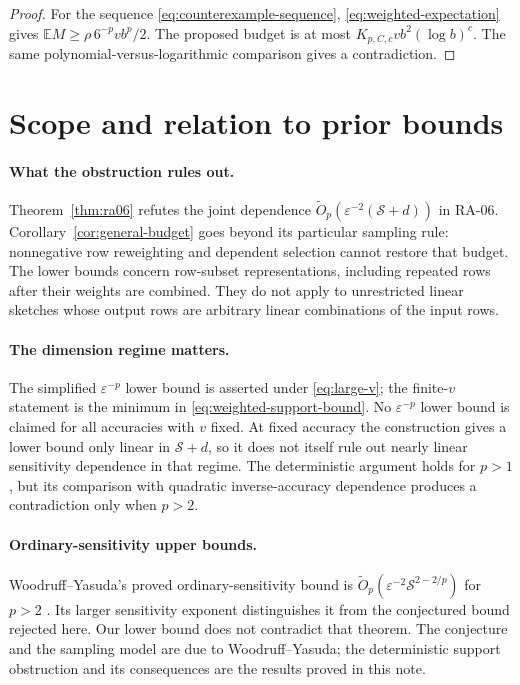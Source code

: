\documentclass[11pt]{article}
\theoremstyle{spaced}
\numberwithin{equation}{section}
\newcommand{\E}{\mathbb{E}}
\newcommand{\Sp}{\mathcal{S}}
\begin{document}
\begin{proof}
For the sequence \eqref{eq:counterexample-sequence},
\eqref{eq:weighted-expectation} gives
$\E M\ge\rho\,6^{-p}vb^p/2$. The proposed budget is at most
$K_{p,C,c}vb^2(\log b)^c$. The same polynomial-versus-logarithmic
comparison gives a contradiction.
\end{proof}

\section{Scope and relation to prior bounds}\label{sec:scope}

\paragraph{What the obstruction rules out.}
Theorem~\ref{thm:ra06} refutes the joint dependence
$\widetilde O_p(\varepsilon^{-2}(\Sp+d))$ in RA-06.
Corollary~\ref{cor:general-budget} goes beyond its particular sampling
rule: nonnegative row reweighting and dependent selection cannot restore
that budget. The lower bounds concern row-subset representations,
including repeated rows after their weights are combined. They do not
apply to unrestricted linear sketches whose output rows are arbitrary
linear combinations of the input rows.

\paragraph{The dimension regime matters.}
The simplified $\varepsilon^{-p}$ lower bound is asserted under
\eqref{eq:large-v}; the finite-$v$ statement is the minimum in
\eqref{eq:weighted-support-bound}. No $\varepsilon^{-p}$ lower bound
is claimed for all accuracies with $v$ fixed. At fixed accuracy the
construction gives a lower bound only linear in $\Sp+d$, so it does
not itself rule out nearly linear sensitivity dependence in that regime.
The deterministic argument holds for $p>1$, but its comparison with
quadratic inverse-accuracy dependence produces a contradiction only
when $p>2$.

\paragraph{Ordinary-sensitivity upper bounds.}
Woodruff--Yasuda's proved ordinary-sensitivity bound is
$\widetilde O_p(\varepsilon^{-2}\Sp^{2-2/p})$ for $p>2$
\cite[Theorem~1.5]{wy}. Its larger sensitivity exponent distinguishes
it from the conjectured bound rejected here. Our lower bound does not
contradict that theorem. The conjecture and the sampling model are due
to Woodruff--Yasuda; the deterministic support obstruction and its
consequences are the results proved in this note.
\end{document}
